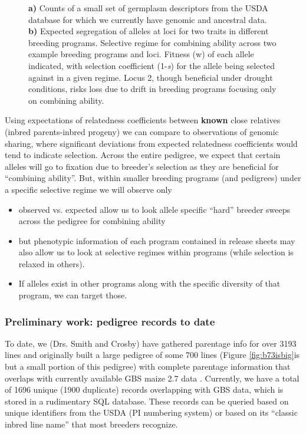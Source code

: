 \documentclass[12pt]{article}
\begin{document}
\begin{figure}[t]
\begin{subfigure}[b]{0.5\textwidth}
                \label{fig:div}
        \end{subfigure}
\caption{\textbf{a)} Counts of a small set of germplasm descriptors from the USDA database for which we currently have genomic and ancestral data. \textbf{b)} Expected segregation of alleles at loci for two traits in different breeding programs.  Selective regime for combining ability across two example breeding programs and loci. Fitness (w) of each allele indicated, with selection coefficient (1-\textit{s}) for the allele being selected against in a given regime. Locus 2, though beneficial under drought conditions, risks loss due to drift in breeding programs focusing only on combining ability. }
\end{figure}

Using expectations of relatedness coefficients between \textbf{known} close relatives (inbred parents-inbred progeny) we can compare to observations of genomic sharing, where significant deviations from expected relatedness coefficients would tend to indicate selection. 
Across the entire pedigree, we expect that certain alleles will go to fixation due to breeder's selection as they are beneficial for ``combining ability''. 
But, within smaller breeding programs (and pedigrees) under a specific selective regime we will observe only 



\begin{itemize}
\item observed vs. expected allow us to look allele specific ``hard'' breeder sweeps across the pedigree for combining ability
\item but phenotypic information of each program contained in release sheets may also allow us to look at selective regimes within programs (while selection is relaxed in others).
\item If alleles exist in other programs along with the specific diversity of that program, we can target those.
\end{itemize}



\subsubsection*{Preliminary work: pedigree records to date}
To date, we (Drs. Smith and Crosby) have gathered parentage info for over 3193 lines and originally built a large pedigree of some 700 lines (Figure \ref{fig:b73isbig}is but a small portion of this pedigree) with complete parentage information that overlaps with currently available GBS maize 2.7 data \citep{Glaubitz:2014eu}. 
Currently, we have a total of 1696 unique (1900 duplicate) records overlapping with GBS data, which is stored in a rudimentary SQL database. 
These records can be queried based on unique identifiers from the USDA (PI numbering system) or based on its ``classic inbred line name'' that most breeders recognize.
\end{document}
